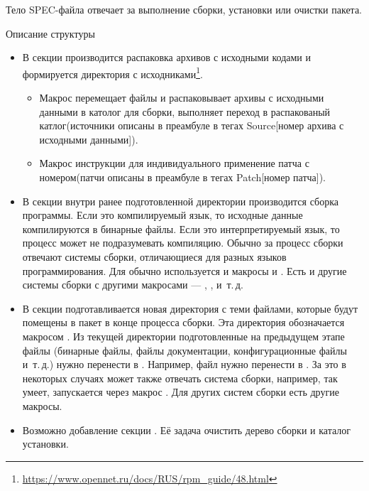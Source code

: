 
Тело SPEC-файла отвечает за выполнение сборки, установки или очистки пакета.

Описание структуры%
\begin{itemize}
	\item В секции  производится распаковка архивов с исходными кодами и
		формируется директория с исходниками\footnote{\href{https://www.opennet.ru/docs/RUS/rpm_guide/48.html}{https://www.opennet.ru/docs/RUS/rpm\_guide/48.html}}.
	\begin{itemize}
		\item Макрос  перемещает файлы и распаковывает архивы с исходными данными в католог для сборки,
		выполняет переход в распакованый катлог(источники описаны в преамбуле в тегах Source[номер архива с исходными данными]).
		\item Макрос  инструкции для индивидуального применение патча с номером(патчи описаны в преамбуле в тегах Patch[номер патча]).
	\end{itemize}
	\item В секции  внутри ранее подготовленной директории производится
		сборка программы. Если это компилируемый язык, то исходные данные компилируются в бинарные
		файлы. Если это интерпретируемый язык, то процесс может не подразумевать компиляцию.
		Обычно за процесс сборки отвечают системы сборки, отличающиеся для разных языков
		программирования. Для  обычно используется  и макросы
		 и . Есть и другие системы сборки с другими
		макросами --- , ,  и~т.\,д.
	\item В секции  подготавливается новая директория с теми файлами, которые будут
		помещены в  пакет в конце процесса сборки. Эта директория обозначается макросом
		. Из текущей директории подготовленные на предыдущем этапе файлы (бинарные
		файлы, файлы документации, конфигурационные файлы и~т.\,д.) нужно перенести в .
		Например, файл  нужно перенести в .
		За это в некоторых случаях может также отвечать система сборки, например, 
		так умеет, запускается через макрос . Для других систем сборки есть другие макросы.
	\item Возможно добавление секции . Её задача очистить дерево сборки и каталог установки.

\end{itemize}
